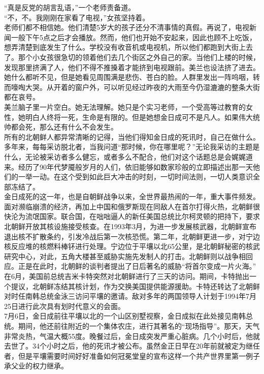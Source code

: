 “真是反党的胡言乱语，”一个老师责备道。\\

“不，不。我刚刚在家看了电视，”女孩坚持着。\\

老师们都不相信她。他们清楚5岁大的孩子还分不清事情的真假。再说了，电视新闻一般下午5点之后才会播放。然而，他们也开始不安起来，因此也顾不上吃饭，想弄清楚到底发生了什么。学校没有收音机或电视机，所以他们都跑到大街上去了。那个小女孩很急切的领着他们去几个街区之外自己的家。当他们上楼的时候，发现那里挤满了人，他们不得不推搡着才能挤到电视跟前。美兰也设法挤了进去。她什么都听不见，但是她看见周围满是悲伤、苍白的脸。人群里发出一阵呜咽，转而嚎啕大哭。从开着的窗户外，可以听见经过昨夜的大雨至今仍湿漉漉的整条大街都在哀号。\\

美兰脑子里一片空白。她无法理解。她只是个实习老师，一个受高等过教育的女性，她明白人终将一死，生命是有限的。但是她想金日成可不是凡人。如果伟大统帅都会死，那么还有什么不会发生。\\

所有的北朝鲜人都异常清晰的记得，当他们得知金日成的死讯时，自己在做什么。多年来，每每采访脱北者，当我问道“那时候，你在哪里呢？”无论我采访的主题是什么，无论被采访者多么健忘，或者多么不配合，他们对这个话题总是会娓娓道来。经历了90年代梦魇般岁月的人们，依旧能够如数家珍般的立即描述出那一天他们的一举一动。在这个受到如此巨大冲击的时刻，一切时间法则，一切人类意识全部冻结了。\\

金日成死的这一年，也是自朝鲜战争以来，全世界最热闹的一年，重大事件频发。面对濒临崩溃的经济，再加上中国和俄罗斯现在同敌人在首尔打得火热，北朝鲜很快沦为流氓国家。联合国，在咄咄逼人的新任美国总统比尔柯灵顿的把持下，要求北朝鲜开放其核设施接受核查。在1993年3月，为进一步发展核武器，北朝鲜宣布退出核不扩散条约，引发冷战后第一次核恐慌。第二年，北朝鲜更进一步，对宁边核反应堆的核燃料棒钚进行处理。宁边位于平壤以北65公里，是北朝鲜秘密的核武研究中心，对此，五角大楼甚至威胁实施先发制人的打击。北朝鲜则以战争相回应。正是在此时，北朝鲜的谈判者提出了日后著名的威胁“将首尔变成一片火海。”\\

在6月，美国前总统吉米卡特突然对北朝鲜进行了三天的访问。期间，卡特抛出一个提议，北朝鲜冻结其核计划，作为交换美国提供能源援助。卡特还转达了北朝鲜对时任南韩总统金泳三访问平壤的邀请。敌对多年的两国领导人计划于1994年7月25日进行此次具有划时代意义的会面。\\

7月6日，金日成前往平壤以北的一个山区别墅视察，金日成拟在此处接见南韩总统。期间，他还前往附近的一个集体农庄，进行其著名的“现场指导”。那天，天气非常炎热，气温大概55度。晚餐过后，金日成突发严重心脏病。几个小时后，他就去世了。34个小时之后，他的死讯才被公布。虽然金正日早在20年前就被定为继任者，但是平壤需要时间好好准备如何冠冕堂皇的宣布这样一个共产世界里第一例子承父业的权力继承。\\

